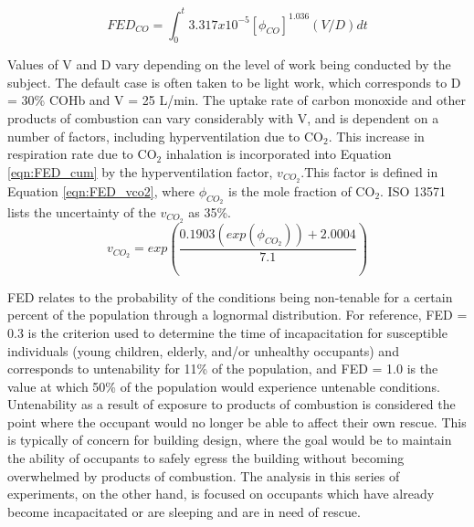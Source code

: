 \documentclass[12pt,oneside]{article}
\begin{document}
\begin{equation}\label{eqn:FED_co}FED_{CO} = \int_{0}^{t} 3.317 x 10^{-5} [\phi_{CO}]^{1.036}(V/D)dt\end{equation}

Values of V and D vary depending on the level of work being conducted by the subject. The default case is often taken to be light work, which corresponds to D = 30\% COHb and V = 25 L/min. The uptake rate of carbon monoxide and other products of combustion can vary considerably with V, and is dependent on a number of factors, including hyperventilation due to CO$_2$. This increase in respiration rate due to CO$_2$ inhalation is incorporated into Equation \ref{eqn:FED_cum} by the hyperventilation factor, $v_{CO_2}$.This factor is defined in Equation \ref{eqn:FED_vco2}, where $\phi_{CO_2}$ is the mole fraction of CO$_2$. ISO 13571 \cite{ISO13571} lists the uncertainty of the $v_{CO_2}$ as 35\%.
\begin{equation}\label{eqn:FED_vco2}v_{CO_2}=exp(\frac{0.1903 (exp(\phi_{CO_2}))+2.0004}{7.1})\end{equation}

FED relates to the probability of the conditions being non-tenable for a certain percent of the population through a lognormal distribution.  For reference, FED = 0.3 is the criterion used to determine the time of incapacitation for susceptible individuals (young children, elderly, and/or unhealthy occupants) and corresponds to untenability for 11\% of the population, and FED = 1.0 is the value at which 50\% of the population would experience untenable conditions. Untenability as a result of exposure to products of combustion is considered the point where the occupant would no longer be able to affect their own rescue. This is typically of concern for building design, where the goal would be to maintain the ability of occupants to safely egress the building without becoming overwhelmed by products of combustion. The analysis in this series of experiments, on the other hand, is focused on occupants which have already become incapacitated or are sleeping and are in need of rescue. 
\end{document}

